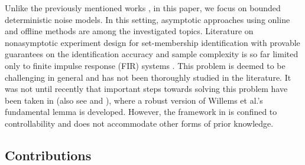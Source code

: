 \documentclass[journal,twoside,web]{ieeecolor}
\begin{document}
Unlike the previously mentioned works \cite{rojas2007robust,gevers1986optimal,deistler1995consistency,weyer2002finite,campi2002finite,venkatasubramanian2025beyond}, in this paper, we focus on bounded deterministic noise models. In this setting, asymptotic approaches using online \cite{karimshoushtari2020design,borchers2011set} and offline \cite{pronzato1989experiment,borchers2011design} methods are among the investigated topics. Literature on nonasymptotic experiment design for set-membership identification with provable guarantees on the identification accuracy and sample complexity is so far limited only to finite impulse response (FIR) systems \cite{dahleh1993sample,poolla1994time}. This problem is deemed to be challenging in general and has not been thoroughly studied in the literature. It was not until recently that important steps towards solving this problem have been taken in \cite{coulson2022quantitative} (also see \cite{berberich2023quantitative} and \cite[Sec. 4.5]{shakouri2025chebyshev}), where a robust version of Willems et al.'s fundamental lemma is developed. However, the framework in \cite{coulson2022quantitative} is confined to controllability and does not accommodate other forms of prior knowledge.

\subsection{Contributions}
\end{document}
